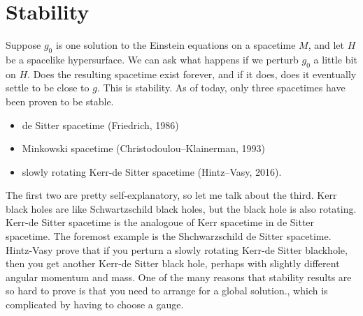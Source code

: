 \documentclass[12pt]{article}
\begin{document}
\section{Stability}
Suppose $g_0$ is one solution to the Einstein equations on a spacetime $M$, and let $H$ be a spacelike hypersurface. We can ask what happens if we perturb $g_0$ a little bit on $H$. Does the resulting spacetime exist forever, and if it does, does it eventually settle to be close to $g$. This is stability. As of today, only three spacetimes have been proven to be stable.
\begin{itemize}
\item de Sitter spacetime (Friedrich, 1986)
\item Minkowski spacetime (Christodoulou--Klainerman, 1993)
\item slowly rotating Kerr-de Sitter spacetime (Hintz--Vasy, 2016).
\end{itemize}
The first two are pretty self-explanatory, so let me talk about the third. Kerr black holes are like Schwartzschild black holes, but the black hole is also rotating. Kerr-de Sitter spacetime is the analogoue of Kerr spacetime in de Sitter spacetime. The foremost example is the Shchwarzschild de Sitter spacetime. Hintz-Vasy prove that if you perturn a slowly rotating Kerr-de Sitter blackhole, then you get another Kerr-de Sitter black hole, perhaps with slightly different angular momentum and mass. One of the many reasons that stability results are so hard to prove is that you need to arrange for a global solution., which is complicated by having to choose a gauge.
\end{document}
